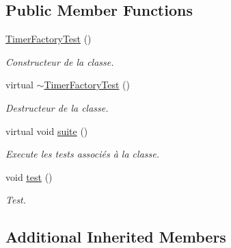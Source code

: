 \subsection*{Public Member Functions}
\begin{DoxyCompactItemize}
\item 
\mbox{\label{classtest_1_1TimerFactoryTest_a4f4c7e59dc1cde8dd597db6e47961706}} 
\hyperlink{classtest_1_1TimerFactoryTest_a4f4c7e59dc1cde8dd597db6e47961706}{Timer\+Factory\+Test} ()
\begin{DoxyCompactList}\small\item\em Constructeur de la classe. \end{DoxyCompactList}\item 
\mbox{\label{classtest_1_1TimerFactoryTest_a765c647d7f2111f514c58bdba4554823}} 
virtual \hyperlink{classtest_1_1TimerFactoryTest_a765c647d7f2111f514c58bdba4554823}{$\sim$\+Timer\+Factory\+Test} ()
\begin{DoxyCompactList}\small\item\em Destructeur de la classe. \end{DoxyCompactList}\item 
\mbox{\label{classtest_1_1TimerFactoryTest_a7ca299c3d89cc65d9fff3c5fd0c6b847}} 
virtual void \hyperlink{classtest_1_1TimerFactoryTest_a7ca299c3d89cc65d9fff3c5fd0c6b847}{suite} ()
\begin{DoxyCompactList}\small\item\em Execute les tests associés à la classe. \end{DoxyCompactList}\item 
\mbox{\label{classtest_1_1TimerFactoryTest_a7f3294b62d0a5f2d2abf90e15cb7a21a}} 
void \hyperlink{classtest_1_1TimerFactoryTest_a7f3294b62d0a5f2d2abf90e15cb7a21a}{test} ()
\begin{DoxyCompactList}\small\item\em Test. \end{DoxyCompactList}\end{DoxyCompactItemize}
\subsection*{Additional Inherited Members}


